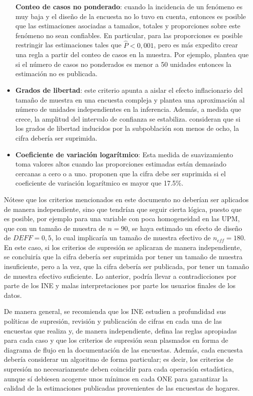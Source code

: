 \documentclass[
  12pt,
]{book}
\begin{document}
\begin{itemize}
  \textbf{Conteo de casos no ponderado}: cuando la incidencia de un fenómeno es muy baja y el diseño de la encuesta no lo tuvo en cuenta, entonces es posible que las estimaciones asociadas a tamaños, totales y proporciones sobre este fenómeno no sean confiables. En particular, para las proporciones es posible restringir las estimaciones tales que \(\hat P <0,001\), pero es más expedito crear una regla a partir del conteo de casos en la muestra. Por ejemplo, \citet{AmericanCommunitySurvey} plantea que si el número de casos no ponderados es menor a 50 unidades entonces la estimación no es publicada.
\item
  \textbf{Grados de libertad}: este criterio apunta a aislar el efecto inflacionario del tamaño de muestra en una encuesta compleja y plantea una aproximación al número de unidades independientes en la inferencia. Además, a medida que crece, la amplitud del intervalo de confianza se estabiliza. \citet{Parker_Talih_Malec_2017} consideran que si los grados de libertad inducidos por la subpoblación son menos de ocho, la cifra debería ser suprimida.
\item
  \textbf{Coeficiente de variación logarítmico}: Esta medida de suavizamiento toma valores altos cuando las proporciones estimadas están demasiado cercanas a cero o a uno. \citet{Barnett_Walker_Chromy_Davis_Emrich_Odom_Packer_2003} proponen que la cifra debe ser suprimida si el coeficiente de variación logarítmico es mayor que 17.5\%.
\end{itemize}

Nótese que los criterios mencionados en este documento no deberían ser aplicados de manera independiente, sino que tendrían que seguir cierta lógica, puesto que es posible, por ejemplo para una variable con poca homogeneidad en las UPM, que con un tamaño de muestra de \(n=90\), se haya estimado un efecto de diseño de \(DEFF=0,5\), lo cual implicaría un tamaño de muestra efectivo de \(n_{eff}=180\). En este caso, si los criterios de supresión se aplicaran de manera independiente, se concluiría que la cifra debería ser suprimida por tener un tamaño de muestra insuficiente, pero a la vez, que la cifra debería ser publicada, por tener un tamaño de muestra efectivo suficiente. Lo anterior, podría llevar a contradicciones por parte de los INE y malas interpretaciones por parte los usuarios finales de los datos.

De manera general, se recomienda que los INE estudien a profundidad sus políticas de supresión, revisión y publicación de cifras en cada una de las encuestas que realiza y, de manera independiente, defina las reglas apropiadas para cada caso y que los criterios de supresión sean plasmados en forma de diagrama de flujo en la documentación de las encuestas. Además, cada encuesta debería considerar un algoritmo de forma particular; es decir, los criterios de supresión no necesariamente deben coincidir para cada operación estadística, aunque sí debiesen acogerse unos mínimos en cada ONE para garantizar la calidad de la estimaciones publicadas provenientes de las encuestas de hogares.
\end{document}
